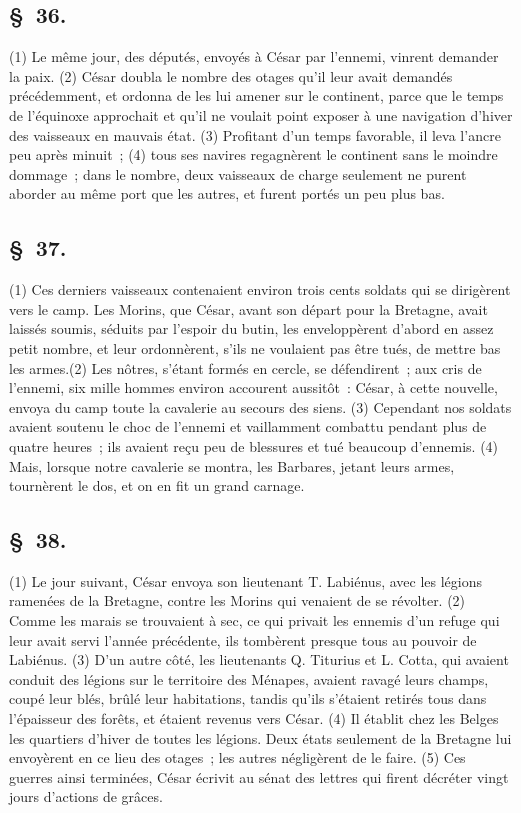 \documentclass[french,twoside]{book} %
\begin{document}
\subsection[{§ 36.}]{ \textsc{§ 36.} }
\noindent (1) Le même jour, des députés, envoyés à César par l’ennemi, vinrent demander la paix. (2) César doubla le nombre des otages qu’il leur avait demandés précédemment, et ordonna de les lui amener sur le continent, parce que le temps de l’équinoxe approchait et qu’il ne voulait point exposer à une navigation d’hiver des vaisseaux en mauvais état. (3) Profitant d’un temps favorable, il leva l’ancre peu après minuit ; (4) tous ses navires regagnèrent le continent sans le moindre dommage ; dans le nombre, deux vaisseaux de charge seulement ne purent aborder au même port que les autres, et furent portés un peu plus bas.
\subsection[{§ 37.}]{ \textsc{§ 37.} }
\noindent (1) Ces derniers vaisseaux contenaient environ trois cents soldats qui se dirigèrent vers le camp. Les Morins, que César, avant son départ pour la Bretagne, avait laissés soumis, séduits par l’espoir du butin, les enveloppèrent d’abord en assez petit nombre, et leur ordonnèrent, s’ils ne voulaient pas être tués, de mettre bas les armes.(2) Les nôtres, s’étant formés en cercle, se défendirent ; aux cris de l’ennemi, six mille hommes environ accourent aussitôt : César, à cette nouvelle, envoya du camp toute la cavalerie au secours des siens. (3) Cependant nos soldats avaient soutenu le choc de l’ennemi et vaillamment combattu pendant plus de quatre heures ; ils avaient reçu peu de blessures et tué beaucoup d’ennemis. (4) Mais, lorsque notre cavalerie se montra, les Barbares, jetant leurs armes, tournèrent le dos, et on en fit un grand carnage.
\subsection[{§ 38.}]{ \textsc{§ 38.} }
\noindent (1) Le jour suivant, César envoya son lieutenant T. Labiénus, avec les légions ramenées de la Bretagne, contre les Morins qui venaient de se révolter. (2) Comme les marais se trouvaient à sec, ce qui privait les ennemis d’un refuge qui leur avait servi l’année précédente, ils tombèrent presque tous au pouvoir de Labiénus. (3) D'un autre côté, les lieutenants Q. Titurius et L. Cotta, qui avaient conduit des légions sur le territoire des Ménapes, avaient ravagé leurs champs, coupé leur blés, brûlé leur habitations, tandis qu’ils s’étaient retirés tous dans l’épaisseur des forêts, et étaient revenus vers César. (4) Il établit chez les Belges les quartiers d’hiver de toutes les légions. Deux états seulement de la Bretagne lui envoyèrent en ce lieu des otages ; les autres négligèrent de le faire. (5) Ces guerres ainsi terminées, César écrivit au sénat des lettres qui firent décréter vingt jours d’actions de grâces.
\end{document}
